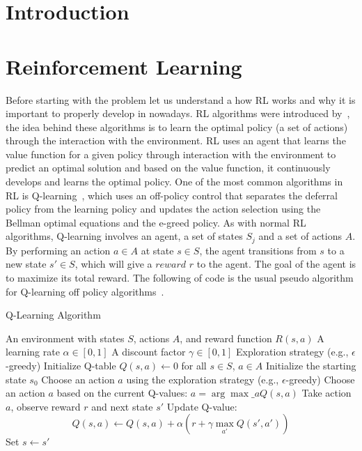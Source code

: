 
\section{Introduction}
\label{sec:problem}

\section{Reinforcement Learning}

Before starting with the problem let us understand a how \ac{RL} works and why it is  
important to properly develop in nowadays.
\ac{RL} algorithms were introduced by~\citet{Sutton1998}, the idea behind these 
algorithms is to learn the optimal policy (a set of actions) through the interaction 
with the environment. \ac{RL} uses an agent that learns the value function for a given policy 
through interaction with the environment to predict an optimal solution and based on the value 
function, it continuously develops and learns the optimal policy. One of the most common algorithms
in \ac{RL} is Q-learning~\cite{8836506}, which uses an off-policy control that separates the deferral 
policy from the learning policy and updates the action selection using the Bellman optimal equations
and the e-greed policy. As with normal \ac{RL} algorithms, Q-learning involves an agent, a set of states
$S_j$ and a set of actions $A$. By performing an action $a\in A$ at state $s \in S$, the agent 
transitions from $s$ to a new state $s' \in S$, which will give a $reward$ $r$ to the agent. 
The goal of the agent is to maximize its 
total reward. The following  
of code is the usual pseudo algorithm for 
Q-learning off policy algorithms~\cite{Sutton1998}.

\begin{algorithm}
\caption{Q-Learning Algorithm}\label{lst:qlearning}
\begin{algorithmic}
\Require An environment with states $S$, actions $A$, and reward function $R(s, a)$
\Require A learning rate $\alpha \in [0, 1]$
\Require A discount factor $\gamma \in [0, 1]$
\Require Exploration strategy (e.g., $\epsilon$-greedy)
\State Initialize Q-table $Q(s, a) \gets 0$ for all $s \in S$, $a \in A$
    \State Initialize the starting state $s_0$
            \State Choose an action $a$ using the exploration strategy (e.g., $\epsilon$-greedy)
        \Else
            \State Choose an action $a$ based on the current Q-values: $a = \arg\max\_a Q(s, a)$
        \EndIf
        \State Take action $a$, observe reward $r$ and next state $s'$
        \State Update Q-value: 
        \[
        Q(s, a) \gets Q(s, a) + \alpha \left( r + \gamma \max_{a'} Q(s', a')\right)
        \]
        \State Set $s \gets s'$
    \EndFor
\EndFor
\end{algorithmic}
\end{algorithm}

